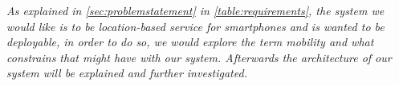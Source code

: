 \textit{As explained in \autoref{sec:problemstatement} in \autoref{table:requirements}, the system we would like is to be location-based service for smartphones and is wanted to be deployable, in order to do so, we would explore the term mobility and what constrains that might have with our system. Afterwards the architecture of our system will be explained and further investigated.}